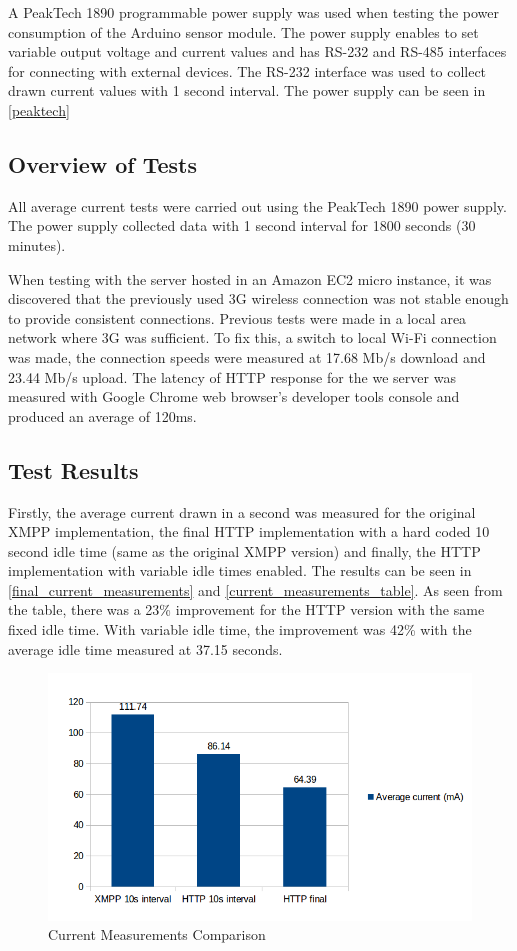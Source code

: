 A PeakTech 1890 programmable power supply was used when testing the power consumption of the Arduino sensor module. The power supply enables to set variable output voltage and current values and has RS-232 and RS-485 interfaces for connecting with external devices. The RS-232 interface was used to collect drawn current values with 1 second interval. The power supply can be seen in \autoref{peaktech}

\subsection{Overview of Tests}

All average current tests were carried out using the PeakTech 1890 power supply. The power supply collected data with 1 second interval for 1800 seconds (30 minutes).

When testing with the server hosted in an Amazon EC2 micro instance, it was discovered that the previously used 3G wireless connection was not stable enough to provide consistent connections. Previous tests were made in a local area network where 3G was sufficient. To fix this, a switch to local Wi-Fi connection was made, the connection speeds were measured at 17.68 Mb/s download and 23.44 Mb/s upload. The latency of HTTP response for the we server was measured with Google Chrome web browser's developer tools console and produced an average of 120ms. 

\subsection{Test Results}

Firstly, the average current drawn in a second was measured for the original XMPP implementation, the final HTTP implementation with a hard coded 10 second idle time (same as the original XMPP version) and finally, the HTTP implementation with variable idle times enabled. The results can be seen in \autoref{final_current_measurements} and \autoref{current_measurements_table}. As seen from the table, there was a 23\% improvement for the HTTP version with the same fixed idle time. With variable idle time, the improvement was 42\% with the average idle time measured at 37.15 seconds. 

\begin{figure}[h!]
\centering
\includegraphics[scale=0.55]{4/figures/final_measurements.png}
\caption{Current Measurements Comparison}
\label{final_current_measurements}
\end{figure}

